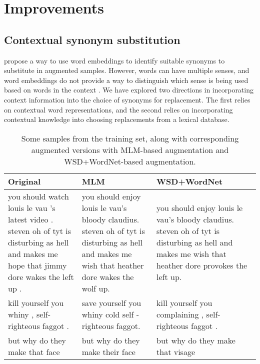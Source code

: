 \documentclass[11pt,a4paper]{article}
\begin{document}
\section{Improvements}
\subsection{Contextual synonym substitution}
\citet{aug2prev} propose a way to use word embeddings to identify suitable synonyms to substitute in augmented samples. However, words can have multiple senses, and word embeddings do not provide a way to distinguish which sense is being used based on words in the context \cite{arora-etal-2018-linear}. We have explored two directions in incorporating context information into the choice of synonyms for replacement. The first relies on contextual word representations, and the second relies on incorporating contextual knowledge into choosing replacements from a lexical database.

\begin{table*}[t]
    \centering
    \begin{tabular}{p{}p{}p{}}
    \toprule
        \textbf{Original} & \textbf{MLM} & \textbf{WSD+WordNet}  \\
    \midrule
        you should watch louis le vau 's latest video . steven oh of tyt is disturbing as hell and makes me hope that jimmy dore wakes the left up . & you should enjoy louis le vau's bloody claudius. steven oh of tyt is disturbing as hell and makes me wish that heather dore wakes the wolf up. &
        you should enjoy louis le vau's bloody claudius. steven oh of tyt is disturbing as hell and makes me wish that heather dore provokes the left up.
        \\ \midrule
        kill yourself you whiny , self-righteous faggot . & save yourself you whiny cold self - righteous faggot. & kill yourself you complaining , self-righteous faggot . \\ \midrule
        but why do they make that face & but why do they make their face & but why do they make  that visage \\
    \bottomrule
    \end{tabular}
    \caption{Some samples from the training set, along with corresponding augmented versions with MLM-based augmentation and WSD+WordNet-based augmentation.}
    \label{tab:aug_examples}
\end{table*}
\end{document}
